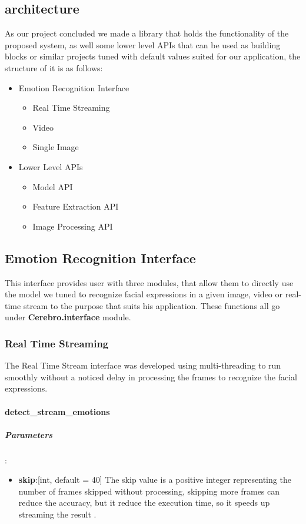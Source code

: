 \subsection{architecture}
As our project concluded we made a library that holds the functionality of the proposed system, as well some lower level APIs that can be used as building blocks or similar projects tuned with default values suited for our application, the structure of it is as follows:
\begin{itemize}
	\item Emotion Recognition Interface 
	\begin{itemize}[noitemsep,nolistsep]
		\item Real Time Streaming
		\item Video
		\item Single Image
	\end{itemize}
	\item Lower Level APIs
	\begin{itemize}[noitemsep,nolistsep]
		\item Model API
		\item Feature Extraction API
		\item Image Processing API
	\end{itemize}
\end{itemize}

\subsection{Emotion Recognition Interface}
This interface provides user with three modules, that allow them to directly use the model we tuned to recognize facial expressions in a given image, video or real-time stream to the purpose that suits his application.\newline
These functions all go under \textbf{Cerebro.interface} module.

\subsubsection{Real Time Streaming}
The Real Time Stream interface was developed using multi-threading to run smoothly without a noticed delay in processing the frames to recognize the facial expressions. 

\paragraph{detect\_stream\_emotions}%
\subparagraph{Parameters}:
\begin{changemargin}{0.5cm}{0cm}
	\begin{itemize}[noitemsep,nolistsep]
		\item\textbf{skip}:[int, default = 40] The skip value is a positive integer representing the number of frames skipped without processing, skipping more frames can reduce the accuracy, but it reduce the execution time, so it speeds up streaming the result .
	\end{itemize}
\end{changemargin}

